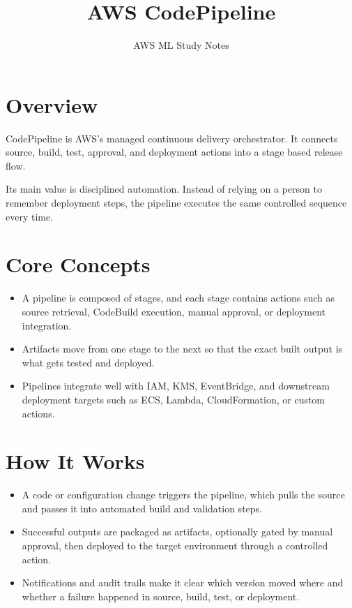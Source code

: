 \documentclass[10pt,twocolumn]{article}
\begin{document}
\title{\vspace{-1.6cm}AWS CodePipeline}
\author{AWS ML Study Notes}
\date{}
\maketitle
\small

\section*{Overview}
CodePipeline is AWS's managed continuous delivery orchestrator. It connects source, build, test, approval, and deployment actions into a stage based release flow.

Its main value is disciplined automation. Instead of relying on a person to remember deployment steps, the pipeline executes the same controlled sequence every time.

\section*{Core Concepts}
\begin{itemize}
\item A pipeline is composed of stages, and each stage contains actions such as source retrieval, CodeBuild execution, manual approval, or deployment integration.
\item Artifacts move from one stage to the next so that the exact built output is what gets tested and deployed.
\item Pipelines integrate well with IAM, KMS, EventBridge, and downstream deployment targets such as ECS, Lambda, CloudFormation, or custom actions.
\end{itemize}

\section*{How It Works}
\begin{itemize}
\item A code or configuration change triggers the pipeline, which pulls the source and passes it into automated build and validation steps.
\item Successful outputs are packaged as artifacts, optionally gated by manual approval, then deployed to the target environment through a controlled action.
\item Notifications and audit trails make it clear which version moved where and whether a failure happened in source, build, test, or deployment.
\end{itemize}
\end{document}
